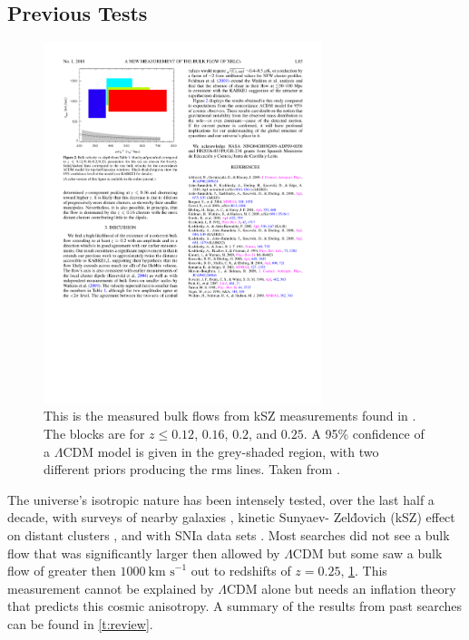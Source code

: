 \documentclass[apj, iop]{emulateapj}
\newcommand{\sn}{SNIa}
\newcommand{\lcdm}{$\Lambda$CDM}     %
\newcommand{\kms}{\ensuremath{~\text{km s}^{-1}}}
\begin{document}
\subsection{Previous Tests}\label{previous-tests}

\begin{figure}
	\includegraphics[width=3.2in]{Kashlinsky2010.pdf} 
    \caption{This is the measured bulk flows from kSZ measurements found in 
    \cite{Kashlinsky10}. The blocks are for $z \leq 0.12$, $0.16$, $0.2$, and 
    $0.25$. A 95\% confidence of a \lcdm{} model is given in the grey-shaded 
    region, with two different priors producing the rms lines.
    Taken from \cite{Kashlinsky10}.}
	\label{f:ksz} 
\end{figure}

The universe's isotropic nature has been intensely tested, over the last half a
decade, with surveys of nearby galaxies \citep{Ma13,Wiltshire:2013dl}, kinetic
Sunyaev- Zel\'{d}ovich (kSZ) effect on distant clusters
\citep{Kashlinsky10,Planckdf}, and with \sn{} data sets \citep[and others as
seen in ]{Dai11,Rathaus13}. Most searches did not see a bulk flow
that was significantly larger then allowed by \lcdm{} but some saw a bulk flow
of greater then $1000 \kms{}$ out to redshifts of $z = 0.25$, \cref{f:ksz}. This
measurement cannot be explained by $\Lambda$CDM alone but needs an inflation
theory that predicts this cosmic anisotropy. A summary of the results from past
searches can be found in \cref{t:review}.
\end{document}
